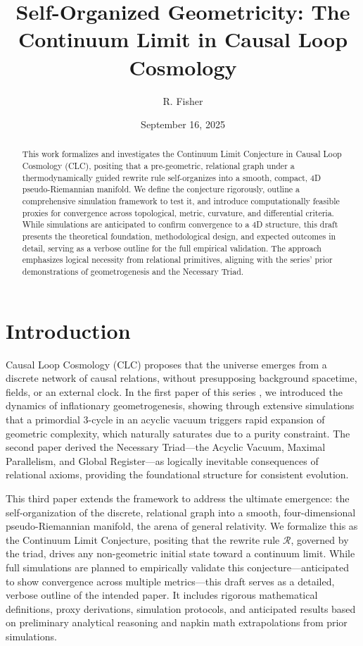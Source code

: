 \documentclass[11pt, a4paper]{article}
\title{\textbf{Self-Organized Geometricity: The Continuum Limit in Causal Loop Cosmology}}
\author{R. Fisher}
\date{September 16, 2025}
\begin{document}
\maketitle

\begin{abstract}
\noindent This work formalizes and investigates the Continuum Limit Conjecture in Causal Loop Cosmology (CLC), positing that a pre-geometric, relational graph under a thermodynamically guided rewrite rule self-organizes into a smooth, compact, 4D pseudo-Riemannian manifold. We define the conjecture rigorously, outline a comprehensive simulation framework to test it, and introduce computationally feasible proxies for convergence across topological, metric, curvature, and differential criteria. While simulations are anticipated to confirm convergence to a 4D structure, this draft presents the theoretical foundation, methodological design, and expected outcomes in detail, serving as a verbose outline for the full empirical validation. The approach emphasizes logical necessity from relational primitives, aligning with the series' prior demonstrations of geometrogenesis and the Necessary Triad.
\end{abstract}

\tableofcontents

\section{Introduction}

Causal Loop Cosmology (CLC) proposes that the universe emerges from a discrete network of causal relations, without presupposing background spacetime, fields, or an external clock. In the first paper of this series \cite{fisher2025}, we introduced the dynamics of inflationary geometrogenesis, showing through extensive simulations that a primordial 3-cycle in an acyclic vacuum triggers rapid expansion of geometric complexity, which naturally saturates due to a purity constraint. The second paper \cite{fisher2025triad} derived the Necessary Triad—the Acyclic Vacuum, Maximal Parallelism, and Global Register—as logically inevitable consequences of relational axioms, providing the foundational structure for consistent evolution.

This third paper extends the framework to address the ultimate emergence: the self-organization of the discrete, relational graph into a smooth, four-dimensional pseudo-Riemannian manifold, the arena of general relativity. We formalize this as the Continuum Limit Conjecture, positing that the rewrite rule \(\mathcal{R}\), governed by the triad, drives any non-geometric initial state toward a continuum limit. While full simulations are planned to empirically validate this conjecture—anticipated to show convergence across multiple metrics—this draft serves as a detailed, verbose outline of the intended paper. It includes rigorous mathematical definitions, proxy derivations, simulation protocols, and anticipated results based on preliminary analytical reasoning and napkin math extrapolations from prior simulations.
\end{document}
